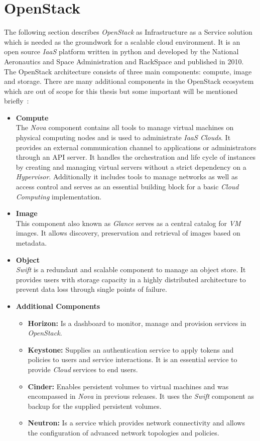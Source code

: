 \section{OpenStack}
The following section describes \textit{OpenStack} as Infrastructure as a Service solution which is needed as the groundwork for a scalable cloud environment.
It is an open source \textit{IaaS} platform written in python and developed by the National Aeronautics and Space Administration and RackSpace and published in 2010.
The OpenStack architecture consists of three main components: compute, image and storage.
There are many additional components in the OpenStack ecosystem which are out of scope for this thesis but some important will be mentioned briefly~\cite{open_stack, open_stack2}:
\begin{itemize}
    \item[]{\textbf{Compute}\\
    The \textit{Nova} component contains all tools to manage virtual machines on physical computing nodes and is used to administrate \textit{IaaS Clouds}.
    It provides an external communication channel to applications or administrators through an API server.
    It handles the orchestration and life cycle of instances by creating and managing virtual servers without a strict dependency on a \textit{Hypervisor}.
    Additionally it includes tools to manage networks as well as access control and serves as an essential building block for a basic \textit{Cloud Computing} implementation.
    }
    \item[]{\textbf{Image}\\
    This component also known as \textit{Glance} serves as a central catalog for \textit{VM} images.
    It allows discovery, preservation and retrieval of images based on metadata.
    }
    \item[]{\textbf{Object}\\
    \textit{Swift} is a redundant and scalable component to manage an object store.
    It provides users with storage capacity in a highly distributed architecture to prevent data loss through single points of failure.
    }
    \item[]{\textbf{Additional Components}
    \begin{itemize}
    \item[]{\textbf{Horizon:} Is a dashboard to monitor, manage and provision services in \textit{OpenStack}.}
    \item[]{\textbf{Keystone:} Supplies an authentication service to apply tokens and policies to users and service interactions.
    It is an essential service to provide \textit{Cloud} services to end users.}
    \item[]{\textbf{Cinder:} Enables persistent volumes to virtual machines and was encompassed in \textit{Nova} in previous releases.
    It uses the \textit{Swift} component as backup for the supplied persistent volumes.
    }
    \item[]{\textbf{Neutron:} Is a service which provides network connectivity and allows the configuration of advanced network topologies and policies.}
    \end{itemize}
    }
\end{itemize}

